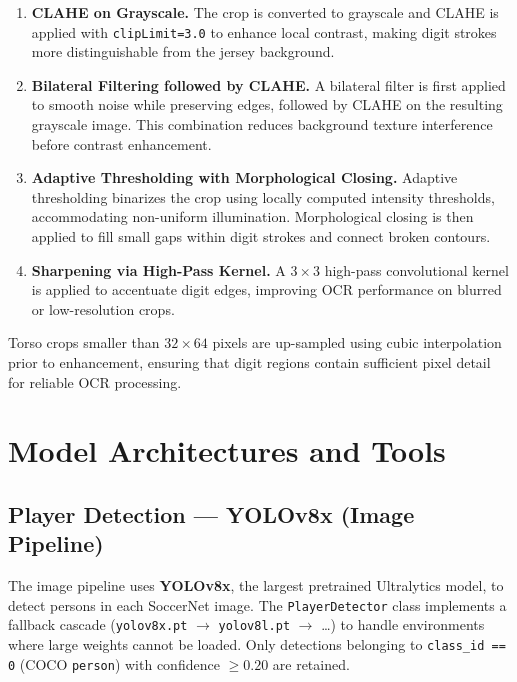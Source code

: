 \begin{enumerate}

    \item \textbf{CLAHE on Grayscale.}
    The crop is converted to grayscale and CLAHE is applied with
    \texttt{clipLimit=3.0} to enhance local contrast, making digit
    strokes more distinguishable from the jersey background.

    \item \textbf{Bilateral Filtering followed by CLAHE.}
    A bilateral filter is first applied to smooth noise while
    preserving edges, followed by CLAHE on the resulting grayscale
    image. This combination reduces background texture interference
    before contrast enhancement.

    \item \textbf{Adaptive Thresholding with Morphological Closing.}
    Adaptive thresholding binarizes the crop using locally computed
    intensity thresholds, accommodating non-uniform illumination.
    Morphological closing is then applied to fill small gaps within
    digit strokes and connect broken contours.

    \item \textbf{Sharpening via High-Pass Kernel.}
    A $3 \times 3$ high-pass convolutional kernel is applied to
    accentuate digit edges, improving OCR performance on blurred
    or low-resolution crops.

\end{enumerate}

Torso crops smaller than $32 \times 64$ pixels are up-sampled using
cubic interpolation prior to enhancement, ensuring that digit regions
contain sufficient pixel detail for reliable OCR processing.

\section{Model Architectures and Tools}
\label{sec:models}

\subsection{Player Detection --- YOLOv8x (Image Pipeline)}

The image pipeline uses \textbf{YOLOv8x}, the largest pretrained
Ultralytics model, to detect persons in each SoccerNet image. The
\texttt{PlayerDetector} class implements a fallback cascade
(\texttt{yolov8x.pt} $\rightarrow$ \texttt{yolov8l.pt} $\rightarrow$
\ldots) to handle environments where large weights cannot be loaded.
Only detections belonging to \texttt{class\_id == 0} (COCO
\texttt{person}) with confidence $\geq 0.20$ are retained.

